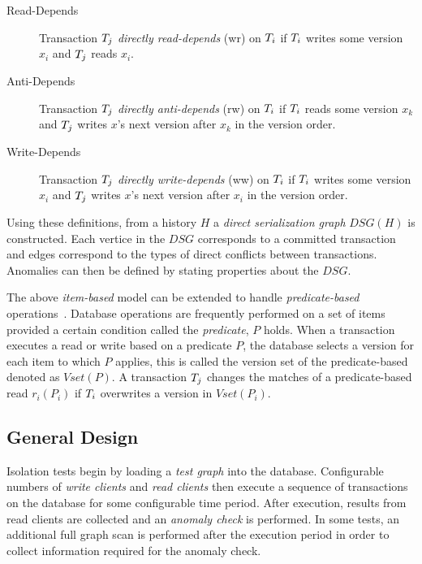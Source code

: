 \begin{description}
  \item[Read-Depends]
    Transaction $T_j$ \emph{directly read-depends} (\textsf{wr}) on
    $T_i$ if $T_i$ writes some version $x_i$ and $T_j$ reads $x_i$.
  \item[Anti-Depends]
    Transaction $T_j$ \emph{directly anti-depends} (\textsf{rw}) on
    $T_i$ if $T_i$ reads some version $x_k$ and $T_j$ writes
    $x$'s next version after $x_k$ in the version order.
  \item[Write-Depends]
    Transaction $T_j$ \emph{directly write-depends} (\textsf{ww}) on
    $T_i$ if $T_i$ writes some version $x_i$ and $T_j$ writes
    $x$'s next version after $x_i$ in the version order.
\end{description}


Using these definitions, from a history $H$ a \emph{direct serialization graph}
$\textit{DSG}(H)$ is constructed. Each vertice in the $\textit{DSG}$ corresponds to
a committed transaction and edges correspond to the types of direct conflicts
between transactions. Anomalies can then be defined by stating properties about
the $\textit{DSG}$.

The above \emph{item-based} model can be extended to handle
\emph{predicate-based} operations~\cite{adya1999weak}. Database operations are
frequently performed on a set of items provided a certain condition called the
\emph{predicate}, $P$ holds. When a transaction executes a read or write based
on a predicate $P$, the database selects a version for each item to which $P$
applies, this is called the version set of the predicate-based denoted as
$\textit{Vset}(P)$. A transaction $T_j$ changes the matches of a
predicate-based read $r_i(P_i)$ if $T_i$ overwrites a version
in $\textit{Vset}(P_i)$.

\subsection{General Design}
\label{sec:design-cons}

Isolation tests begin by loading a \emph{test graph} into the database.
Configurable numbers of \emph{write clients} and \emph{read clients} then
execute a sequence of transactions on the database for some configurable time
period. After execution, results from read clients are collected and an
\emph{anomaly check} is performed. In some tests, an additional full graph scan
is performed after the execution period in order to collect information required
for the anomaly check.

